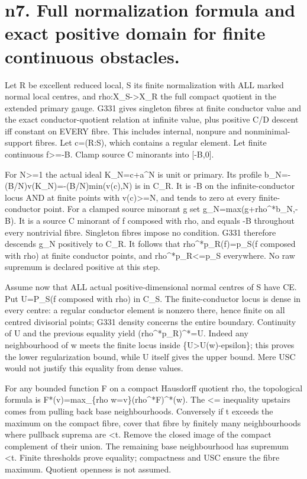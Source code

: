 \documentclass[11pt]{article}
\begin{document}
\section*{n7. Full normalization formula and exact positive domain for finite continuous obstacles.}
Let R be excellent reduced local, S its finite normalization with ALL marked normal local centres, and rho:X\_S->X\_R the full compact quotient in the extended primary gauge. G331 gives singleton fibres at finite conductor value and the exact conductor-quotient relation at infinite value, plus positive C/D descent iff constant on EVERY fibre. This includes internal, nonpure and nonminimal-support fibres. Let c=(R:S), which contains a regular element. Let finite continuous f>=-B. Clamp source C minorants into [-B,0].

For N>=1 the actual ideal K\_N=c+a\textasciicircum{}N is unit or primary. Its profile b\_N=-(B/N)v(K\_N)=-(B/N)min(v(c),N) is in C\_R. It is -B on the infinite-conductor locus AND at finite points with v(c)>=N, and tends to zero at every finite-conductor point. For a clamped source minorant g set g\_N=max(g+rho\textasciicircum{}*b\_N,-B). It is a source C minorant of f composed with rho, and equals -B throughout every nontrivial fibre. Singleton fibres impose no condition. G331 therefore descends g\_N positively to C\_R. It follows that rho\textasciicircum{}*p\_R(f)=p\_S(f composed with rho) at finite conductor points, and rho\textasciicircum{}*p\_R<=p\_S everywhere. No raw supremum is declared positive at this step.

Assume now that ALL actual positive-dimensional normal centres of S have CE. Put U=P\_S(f composed with rho) in C\_S. The finite-conductor locus is dense in every centre: a regular conductor element is nonzero there, hence finite on all centred divisorial points; G331 density concerns the entire boundary. Continuity of U and the previous equality yield (rho\textasciicircum{}*p\_R)\textasciicircum{}*=U. Indeed any neighbourhood of w meets the finite locus inside \{U>U(w)-epsilon\}; this proves the lower regularization bound, while U itself gives the upper bound. Mere USC would not justify this equality from dense values.

For any bounded function F on a compact Hausdorff quotient rho, the topological formula is F*(v)=max\_\{rho w=v\}(rho\textasciicircum{}*F)\textasciicircum{}*(w). The <= inequality upstairs comes from pulling back base neighbourhoods. Conversely if t exceeds the maximum on the compact fibre, cover that fibre by finitely many neighbourhoods where pullback suprema are <t. Remove the closed image of the compact complement of their union. The remaining base neighbourhood has supremum <t. Finite thresholds prove equality; compactness and USC ensure the fibre maximum. Quotient openness is not assumed.
\end{document}
